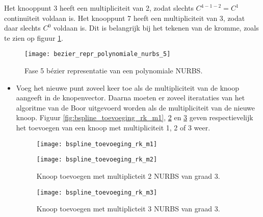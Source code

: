 \begin{itemize}
{\begin{itemize}
			Het knooppunt 3 heeft een multipliciteit van 2, zodat slechts $C^{4 - 1 - 2} = C^1$ continuïteit voldaan is. Het knooppunt 7 heeft een multipliciteit van 3, zodat daar slechts $C^0$ voldaan is. Dit is belangrijk bij het tekenen van de kromme, zoals te zien op figuur \ref{fig:bezier_repr_polynomiale_nurbs_5}.
			\begin{figure}[ht]
				\centering
				\texttt{[image: bezier\_repr\_polynomiale\_nurbs\_5]}	
				\caption{Fase 5 bézier representatie van een polynomiale NURBS.}
				\label{fig:bezier_repr_polynomiale_nurbs_5}
			\end{figure}
		\end{itemize}}
	{
		\begin{itemize} 
			\item Voeg het nieuwe punt zoveel keer toe als de multipliciteit van de knoop aangeeft in de knopenvector. Daarna moeten er zoveel iterataties van het algoritme van de Boor uitgevoerd worden als de multipliciteit van de nieuwe knoop. Figuur \ref{fig:bspline_toevoeging_rk_m1}, \ref{fig:bspline_toevoeging_rk_m2} en \ref{fig:bspline_toevoeging_rk_m3} geven respectievelijk het toevoegen van een knoop met multipliciteit 1, 2 of 3 weer.
			\begin{figure}[ht]
				\begin{minipage}{0.5\textwidth}
					\centering
					\texttt{[image: bspline\_toevoeging\_rk\_m1]}	
					\caption{Knoop toevoegen met multiplicteit 1 bij een NURBS van graad 3.}
					\label{fig:bspline_toevoeging_rk_m1}
				\end{minipage}
				\begin{minipage}{0.5\textwidth}
					\centering
					\texttt{[image: bspline\_toevoeging\_rk\_m2]}	
					\caption{Knoop toevoegen met multiplicteit 2 NURBS van graad 3.}
					\label{fig:bspline_toevoeging_rk_m2}
				\end{minipage}
			\end{figure}
			\begin{figure}[ht]
				\centering
				\texttt{[image: bspline\_toevoeging\_rk\_m3]}	
				\caption{Knoop toevoegen met multiplicteit 3 NURBS van graad 3.}
				\label{fig:bspline_toevoeging_rk_m3}
			\end{figure}
		\end{itemize}
}
\end{itemize}
